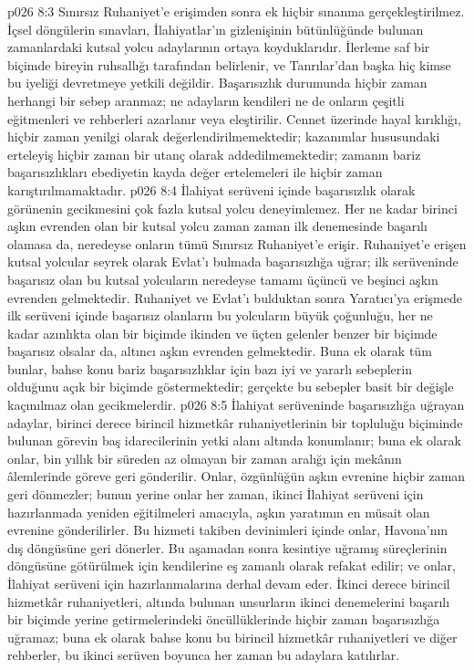 \vs p026 8:3 Sınırsız Ruhaniyet’e erişimden sonra ek hiçbir sınanma gerçekleştirilmez. İçsel döngülerin sınavları, İlahiyatlar’ın gizlenişinin bütünlüğünde bulunan zamanlardaki kutsal yolcu adaylarının ortaya koyduklarıdır. İlerleme saf bir biçimde bireyin ruhsallığı tarafından belirlenir, ve Tanrılar’dan başka hiç kimse bu iyeliği devretmeye yetkili değildir. Başarısızlık durumunda hiçbir zaman herhangi bir sebep aranmaz; ne adayların kendileri ne de onların çeşitli eğitmenleri ve rehberleri azarlanır veya eleştirilir. Cennet üzerinde hayal kırıklığı, hiçbir zaman yenilgi olarak değerlendirilmemektedir; kazanımlar hususundaki erteleyiş hiçbir zaman bir utanç olarak addedilmemektedir; zamanın bariz başarısızlıkları ebediyetin kayda değer ertelemeleri ile hiçbir zaman karıştırılmamaktadır.
\vs p026 8:4 İlahiyat serüveni içinde başarısızlık olarak görünenin gecikmesini çok fazla kutsal yolcu deneyimlemez. Her ne kadar birinci aşkın evrenden olan bir kutsal yolcu zaman zaman ilk denemesinde başarılı olamasa da, neredeyse onların tümü Sınırsız Ruhaniyet’e erişir. Ruhaniyet’e erişen kutsal yolcular seyrek olarak Evlat’ı bulmada başarısızlığa uğrar; ilk serüveninde başarısız olan bu kutsal yolcuların neredeyse tamamı üçüncü ve beşinci aşkın evrenden gelmektedir. Ruhaniyet ve Evlat’ı bulduktan sonra Yaratıcı’ya erişmede ilk serüveni içinde başarısız olanların bu yolcuların büyük çoğunluğu, her ne kadar azınlıkta olan bir biçimde ikinden ve üçten gelenler benzer bir biçimde başarısız olsalar da, altıncı aşkın evrenden gelmektedir. Buna ek olarak tüm bunlar, bahse konu bariz başarısızlıklar için bazı iyi ve yararlı sebeplerin olduğunu açık bir biçimde göstermektedir; gerçekte bu sebepler basit bir değişle kaçınılmaz olan gecikmelerdir.
\vs p026 8:5 İlahiyat serüveninde başarısızlığa uğrayan adaylar, birinci derece birincil hizmetkâr ruhaniyetlerinin bir topluluğu biçiminde bulunan görevin baş idarecilerinin yetki alanı altında konumlanır; buna ek olarak onlar, bin yıllık bir süreden az olmayan bir zaman aralığı için mekânın âlemlerinde göreve geri gönderilir. Onlar, özgünlüğün aşkın evrenine hiçbir zaman geri dönmezler; bunun yerine onlar her zaman, ikinci İlahiyat serüveni için hazırlanmada yeniden eğitilmeleri amacıyla, aşkın yaratımın en müsait olan evrenine gönderilirler. Bu hizmeti takiben devinimleri içinde onlar, Havona’nın dış döngüsüne geri dönerler. Bu aşamadan sonra kesintiye uğramış süreçlerinin döngüsüne götürülmek için kendilerine eş zamanlı olarak refakat edilir; ve onlar, İlahiyat serüveni için hazırlanmalarına derhal devam eder. İkinci derece birincil hizmetkâr ruhaniyetleri, altında bulunan unsurların ikinci denemelerini başarılı bir biçimde yerine getirmelerindeki öncüllüklerinde hiçbir zaman başarısızlığa uğramaz; buna ek olarak bahse konu bu birincil hizmetkâr ruhaniyetleri ve diğer rehberler, bu ikinci serüven boyunca her zaman bu adaylara katılırlar.
